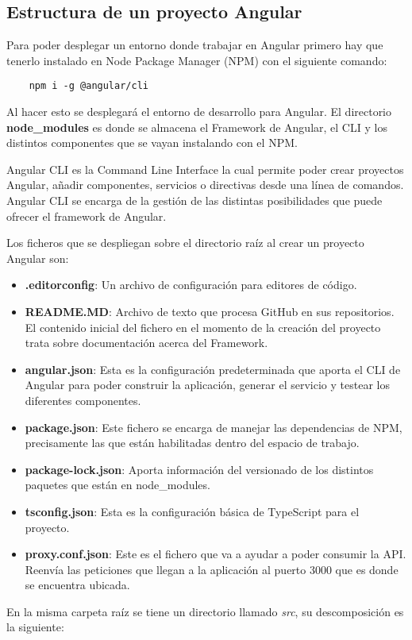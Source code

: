 \subsection{Estructura de un proyecto Angular}
Para poder desplegar un entorno donde trabajar en Angular primero hay que tenerlo instalado en Node Package Manager (NPM) con el siguiente comando:
\begin{verbatim}
    npm i -g @angular/cli
\end{verbatim}
Al hacer esto se desplegará el entorno de desarrollo para Angular. El directorio \textbf{node\_modules} es donde se almacena el Framework de Angular, el CLI y los distintos componentes que se vayan instalando con el NPM.
\begin{tcolorbox}
    [colback=green!5!white,colframe=green!75!black,fonttitle=\bfseries,title=¿Qué diferencias hay entre Angular CLI y Angular Framework?]
    Angular CLI es la Command Line Interface la cual permite poder crear proyectos Angular, añadir componentes, servicios o directivas desde una línea de comandos. Angular CLI se encarga de la gestión de las distintas posibilidades que puede ofrecer el framework de Angular.
\end{tcolorbox}
Los ficheros que se despliegan sobre el directorio raíz al crear un proyecto Angular \cite{angular-file-structure} son:
\begin{itemize}
    \item \textbf{.editorconfig}: Un archivo de configuración para editores de código.
    \item \textbf{README.MD}: Archivo de texto que procesa GitHub en sus repositorios. El contenido inicial del fichero en el momento de la creación del proyecto trata sobre documentación acerca del Framework.
    \item \textbf{angular.json}: Esta es la configuración predeterminada que aporta el CLI de Angular para poder construir la aplicación, generar el servicio y testear los diferentes componentes.
    \item \textbf{package.json}: Este fichero se encarga de manejar las dependencias de NPM, precisamente las que están habilitadas dentro del espacio de trabajo.
    \item \textbf{package-lock.json}: Aporta información del versionado de los distintos paquetes que están en node\_modules.
    \item \textbf{tsconfig.json}: Esta es la configuración básica de TypeScript para el proyecto.
    \item \textbf{proxy.conf.json}: Este es el fichero que va a ayudar a poder consumir la API. Reenvía las peticiones que llegan a la aplicación al puerto 3000 que es donde se encuentra ubicada.
\end{itemize}
En la misma carpeta raíz se tiene un directorio llamado \textit{src}, su descomposición es la siguiente:

